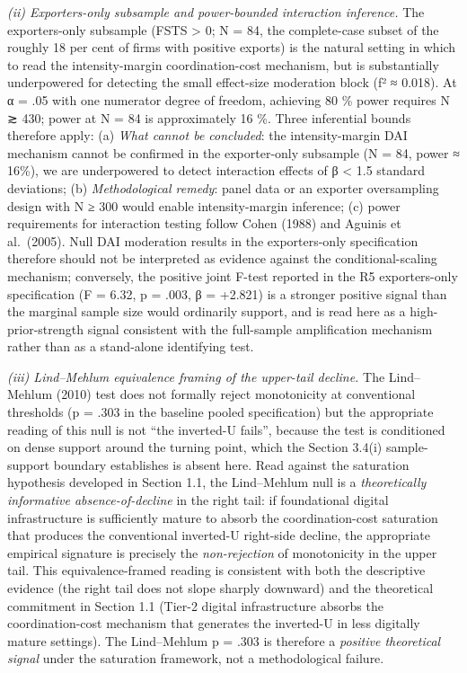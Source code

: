 \documentclass[
  12pt,a4paper]{article}
\begin{document}
\emph{(ii) Exporters-only subsample and power-bounded interaction
inference.} The exporters-only subsample (FSTS \textgreater{} 0; N = 84,
the complete-case subset of the roughly 18 per cent of firms with
positive exports) is the natural setting in which to read the
intensity-margin coordination-cost mechanism, but is substantially
underpowered for detecting the small effect-size moderation block (f² ≈
0.018). At α = .05 with one numerator degree of freedom, achieving 80 \%
power requires N ≳ 430; power at N = 84 is approximately 16 \%. Three
inferential bounds therefore apply: (a) \emph{What cannot be concluded}:
the intensity-margin DAI mechanism cannot be confirmed in the
exporter-only subsample (N = 84, power ≈ 16\%), we are underpowered to
detect interaction effects of β \textless{} 1.5 standard deviations; (b)
\emph{Methodological remedy}: panel data or an exporter oversampling
design with N ≥ 300 would enable intensity-margin inference; (c) power
requirements for interaction testing follow Cohen (1988) and Aguinis et
al.~(2005). Null DAI moderation results in the exporters-only
specification therefore should not be interpreted as evidence against
the conditional-scaling mechanism; conversely, the positive joint F-test
reported in the R5 exporters-only specification (F = 6.32, p = .003, β =
+2.821) is a stronger positive signal than the marginal sample size
would ordinarily support, and is read here as a high-prior-strength
signal consistent with the full-sample amplification mechanism rather
than as a stand-alone identifying test.

\emph{(iii) Lind--Mehlum equivalence framing of the upper-tail decline.}
The Lind--Mehlum (2010) test does not formally reject monotonicity at
conventional thresholds (p = .303 in the baseline pooled specification)
but the appropriate reading of this null is not ``the inverted-U
fails'', because the test is conditioned on dense support around the
turning point, which the Section 3.4(i) sample-support boundary
establishes is absent here. Read against the saturation hypothesis
developed in Section 1.1, the Lind--Mehlum null is a \emph{theoretically
informative absence-of-decline} in the right tail: if foundational
digital infrastructure is sufficiently mature to absorb the
coordination-cost saturation that produces the conventional inverted-U
right-side decline, the appropriate empirical signature is precisely the
\emph{non-rejection} of monotonicity in the upper tail. This
equivalence-framed reading is consistent with both the descriptive
evidence (the right tail does not slope sharply downward) and the
theoretical commitment in Section 1.1 (Tier-2 digital infrastructure
absorbs the coordination-cost mechanism that generates the inverted-U in
less digitally mature settings). The Lind--Mehlum p = .303 is therefore
a \emph{positive theoretical signal} under the saturation framework, not
a methodological failure.
\end{document}
